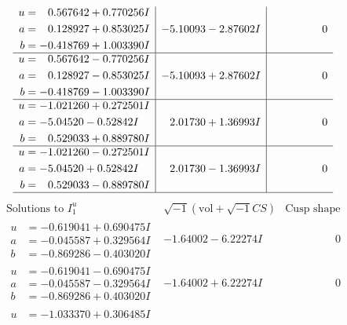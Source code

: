 \documentclass[1p]{elsarticle_modified}
\theoremstyle{definition}
\newcommand{\I}{\sqrt{-1}}
\begin{document}
$$\begin{array}{c|c|c}
\begin{aligned}
u &= \phantom{-}0.567642 + 0.770256 I \\
a &= \phantom{-}0.128927 + 0.853025 I \\
b &= -0.418769 + 1.003390 I\end{aligned}
 & -5.10093 - 2.87602 I & \phantom{-0.000000 } 0 \\ \hline\begin{aligned}
u &= \phantom{-}0.567642 - 0.770256 I \\
a &= \phantom{-}0.128927 - 0.853025 I \\
b &= -0.418769 - 1.003390 I\end{aligned}
 & -5.10093 + 2.87602 I & \phantom{-0.000000 } 0 \\ \hline\begin{aligned}
u &= -1.021260 + 0.272501 I \\
a &= -5.04520 - 0.52842 I \\
b &= \phantom{-}0.529033 + 0.889780 I\end{aligned}
 & \phantom{-}2.01730 + 1.36993 I & \phantom{-0.000000 } 0 \\ \hline\begin{aligned}
u &= -1.021260 - 0.272501 I \\
a &= -5.04520 + 0.52842 I \\
b &= \phantom{-}0.529033 - 0.889780 I\end{aligned}
 & \phantom{-}2.01730 - 1.36993 I & \phantom{-0.000000 } 0\\
 \hline 
 \end{array}$$\newpage$$\begin{array}{c|c|c}  
\text{Solutions to }I^u_{1}& \I (\text{vol} + \sqrt{-1}CS) & \text{Cusp shape}\\
 \hline 
\begin{aligned}
u &= -0.619041 + 0.690475 I \\
a &= -0.045587 + 0.329564 I \\
b &= -0.869286 - 0.403020 I\end{aligned}
 & -1.64002 - 6.22274 I & \phantom{-0.000000 } 0 \\ \hline\begin{aligned}
u &= -0.619041 - 0.690475 I \\
a &= -0.045587 - 0.329564 I \\
b &= -0.869286 + 0.403020 I\end{aligned}
 & -1.64002 + 6.22274 I & \phantom{-0.000000 } 0 \\ \hline\begin{aligned}
u &= -1.033370 + 0.306485 I \\

\end{aligned}
\end{array}$$
\end{document}
